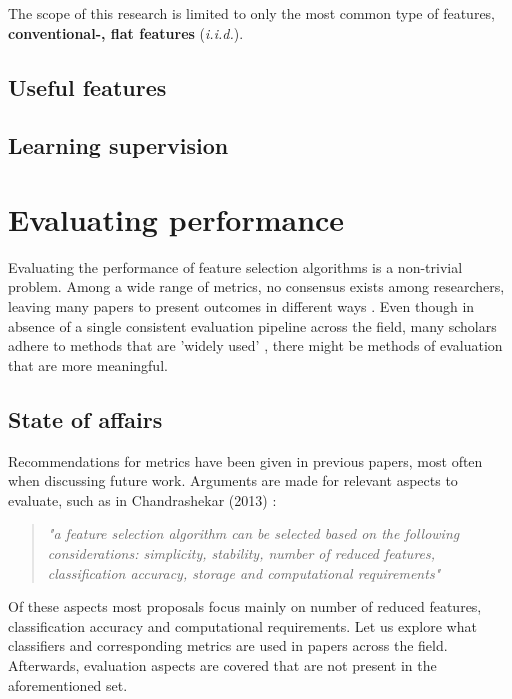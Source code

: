 \documentclass{article}
\begin{document}
The scope of this research is limited to only the most common type of features, \textbf{conventional-, flat features} (\textit{i.i.d.}).

\subsection{Useful features}

\subsection{Learning supervision}

\section{Evaluating performance}
Evaluating the performance of feature selection algorithms is a non-trivial problem. Among a wide range of metrics, no consensus exists among researchers, leaving many papers to present outcomes in different ways \citep{guyon2003introduction}. Even though in absence of a single consistent evaluation pipeline across the field, many scholars adhere to methods that are 'widely used' \citep{solorio2020review} \citep{li2017feature}, there might be methods of evaluation that are more meaningful. %

\subsection{State of affairs}
Recommendations for metrics have been given in previous papers, most often when discussing future work. Arguments are made for relevant aspects to evaluate, such as in Chandrashekar (2013) \citep{chandrashekar2014survey}: \begin{quote}\textit{"a feature selection algorithm can be selected based on the following considerations: simplicity, stability, number of reduced features, classification accuracy, storage and computational requirements"}\end{quote}Of these aspects most proposals focus mainly on number of reduced features, classification accuracy and computational requirements. Let us explore what classifiers and corresponding metrics are used in papers across the field. Afterwards, evaluation aspects are covered that are not present in the aforementioned set.
\end{document}
